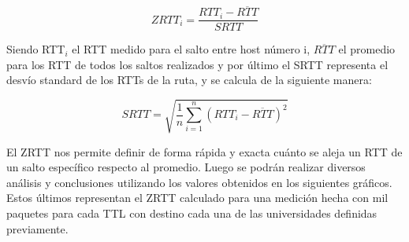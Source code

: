  \begin{equation}
 	ZRTT_i = \frac{RTT_i - \overline{RTT}}{SRTT} 
 \end{equation}

 Siendo RTT$_{i}$ el RTT medido para el salto entre host número i, $\overline{RTT}$ el promedio para los RTT de todos los saltos realizados y por último el SRTT representa el desvío standard de los RTTs de la ruta, y se calcula de la siguiente manera:

\begin{equation}
 	SRTT = \sqrt{\frac{1}{n} \sum_{i=1}^{n} (RTT_i - \overline{RTT})^2}
 \end{equation}

El ZRTT nos permite definir de forma rápida y exacta cuánto se aleja un RTT de un salto específico respecto al promedio. Luego se podrán realizar diversos análisis y conclusiones utilizando los valores obtenidos en los siguientes gráficos. Estos últimos representan el ZRTT calculado para una medición hecha con mil paquetes para cada TTL con destino cada una de las universidades definidas previamente. 





